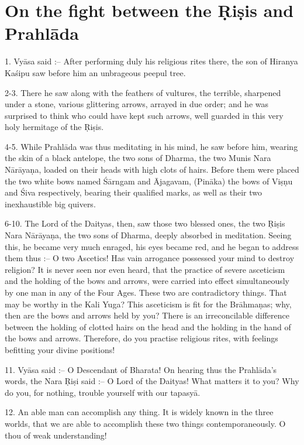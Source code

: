 \chapter{On the fight between the \d{R}i\d{s}is and Prahl\=ada}

1. Vy\=asa said :-- After performing duly his religious rites there, the son of Hiranya Ka\'sipu saw before him an unbrageous peepul tree.

2-3. There he saw along with the feathers of vultures, the terrible, sharpened under a stone, various glittering arrows, arrayed in due order; and he was surprised to think who could have kept such arrows, well guarded in this very holy hermitage of the \d{R}i\d{s}is.

4-5. While Prahl\=ada was thus meditating in his mind, he saw before him, wearing the skin of a black antelope, the two sons of Dharma, the two Munis Nara N\=ar\=aya\d{n}a, loaded on their heads with high clots of hairs. Before them were placed the two white bows named \'S\=arngam and \=Ajagavam, (Pin\=aka) the bows of Vi\d{s}\d{n}u and \'Siva respectively, bearing their qualified marks, as well as their two inexhaustible big quivers.

6-10. The Lord of the Daityas, then, saw those two blessed ones, the two \d{R}i\d{s}is Nara N\=ar\=aya\d{n}a, the two sons of Dharma, deeply absorbed in meditation. Seeing this, he became very much enraged, his eyes became red, and he began to address them thus :-- O two Ascetics! Has vain arrogance possessed your mind to destroy religion? It is never seen nor even heard, that the practice of severe asceticism and the holding of the bows and arrows, were carried into effect simultaneously by one man in any of the Four Ages. These two are contradictory things. That may be worthy in the Kali Yuga? This asceticism is fit for the Br\=ahma\d{n}as; why, then are the bows and arrows held by you? There is an irreconcilable difference between the holding of clotted hairs on the head and the holding in the hand of the bows and arrows. Therefore, do you practise religious rites, with feelings befitting your divine positions!

11. Vy\=asa said :-- O Descendant of Bharata! On hearing thus the Prahl\=ada's words, the Nara \d{R}i\d{s}i said :-- O Lord of the Daityas! What matters it to you? Why do you, for nothing, trouble yourself with our tapasy\=a.

12. An able man can accomplish any thing. It is widely known in the three worlds, that we are able to accomplish these two things contemporaneously. O thou of weak understanding!

